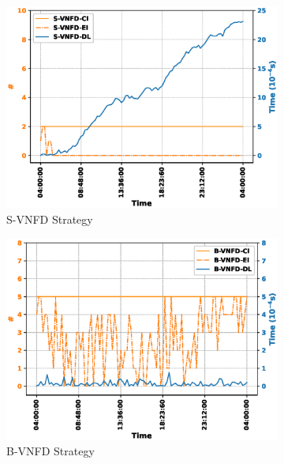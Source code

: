 \documentclass[conference, final]{IEEEtran}
\begin{document}
{\begin{figure}
\begin{subfigure}[h]{0.32\linewidth}
\includegraphics[width=\linewidth]{./figures/S-VNFDinstance_trace.eps}
\caption{{\textsf{S-VNFD}} Strategy}
\end{subfigure}
\hfill
\begin{subfigure}[h]{0.32\linewidth}
\includegraphics[width=\linewidth]{./figures/B-VNFDinstance_trace.eps}
\caption{{\textsf{B-VNFD}} Strategy}
\end{subfigure}
\hfill
\begin{subfigure}[h]{0.32\linewidth}

\end{subfigure}
\end{figure}}
\end{document}
